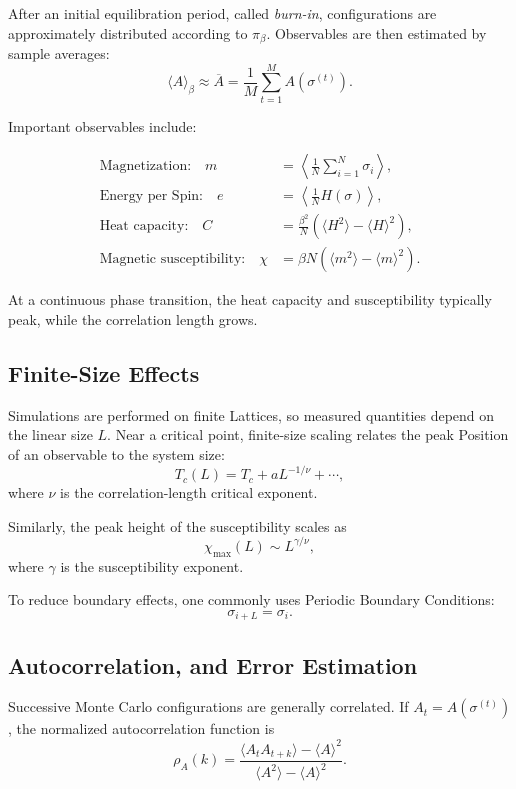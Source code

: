 \documentclass[a4paper, 10pt, onepage]{elegantbook}
\begin{document}
{After an initial equilibration period, called \emph{burn-in}, configurations
are approximately distributed according to \(\pi_\beta\). Observables are then
estimated by sample averages:
\[
\langle A\rangle_\beta
\approx
\overline A
=
\frac{1}{M}
\sum_{t=1}^{M}A(\sigma^{(t)}).
\]

Important observables include:

\begin{align}
\text{Magnetization:}\quad
m
&=
\left\langle\frac{1}{N}\sum_{i=1}^N\sigma_i\right\rangle,\\[4pt]
\text{Energy per Spin:}\quad
e
&=
\left\langle\frac{1}{N}H(\sigma)\right\rangle,\\[4pt]
\text{Heat capacity:}\quad
C
&=
\frac{\beta^2}{N}
\left(
\langle H^2\rangle-\langle H\rangle^2
\right),\\[4pt]
\text{Magnetic susceptibility:}\quad
\chi
&=
\beta N
\left(
\langle m^2\rangle-\langle m\rangle^2
\right).
\end{align}

At a continuous phase transition, the heat capacity and susceptibility typically
peak, while the correlation length grows.

\subsection{Finite-Size Effects}

Simulations are performed on finite Lattices, so measured quantities depend on
the linear size \(L\). Near a critical point, finite-size scaling relates the
peak Position of an observable to the system size:
\[
T_c(L)
=
T_c+aL^{-1/\nu}+\cdots,
\]
where \(\nu\) is the correlation-length critical exponent.

Similarly, the peak height of the susceptibility scales as
\[
\chi_{\max}(L)
\sim
L^{\gamma/\nu},
\]
where \(\gamma\) is the susceptibility exponent.

To reduce boundary effects, one commonly uses Periodic Boundary Conditions:
\[
\sigma_{i+L}=\sigma_i.
\]

\subsection{Autocorrelation, and Error Estimation}

Successive Monte Carlo configurations are generally correlated. If
\(A_t=A(\sigma^{(t)})\), the normalized autocorrelation function is
\[
\rho_A(k)
=
\frac{
\langle A_tA_{t+k}\rangle-\langle A\rangle^2
}{
\langle A^2\rangle-\langle A\rangle^2
}.
\]

}
\end{document}
